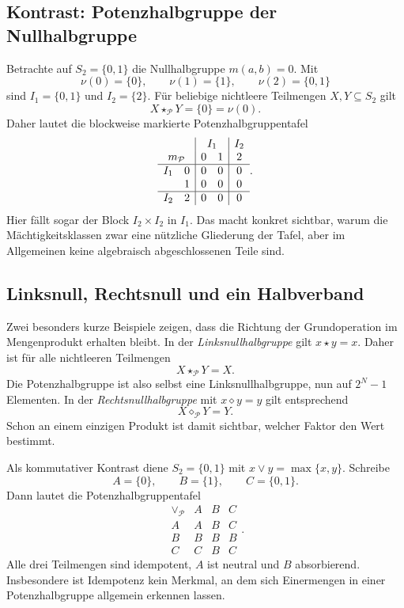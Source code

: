 \documentclass[main.tex]{subfiles}
\begin{document}
\subsection{Kontrast: Potenzhalbgruppe der Nullhalbgruppe}

Betrachte auf \(S_2=\{0,1\}\) die Nullhalbgruppe \(m(a,b)=0\).  Mit
\[
  \nu(0)=\{0\},
  \qquad
  \nu(1)=\{1\},
  \qquad
  \nu(2)=\{0,1\}
\]
sind \(I_1=\{0,1\}\) und \(I_2=\{2\}\).  Für beliebige nichtleere
Teilmengen \(X,Y\subseteq S_2\) gilt
\[
  X\star_{\mathcal P}Y=\{0\}=\nu(0).
\]
Daher lautet die blockweise markierte Potenzhalbgruppentafel
\[
\begin{array}{cc|cc|c}
\multicolumn{2}{c|}{}
  &\multicolumn{2}{c|}{I_1}
  &\multicolumn{1}{c}{I_2}\\
\multicolumn{2}{c|}{m_{\mathcal P}}&0&1&2\\\hline
I_1&0&0&0&0\\
   &1&0&0&0\\\hline
I_2&2&0&0&0
\end{array}.
\]
Hier fällt sogar der Block \(I_2\times I_2\) in \(I_1\).  Das macht konkret
sichtbar, warum die Mächtigkeitsklassen zwar eine nützliche Gliederung der
Tafel, aber im Allgemeinen keine algebraisch abgeschlossenen Teile sind.

\subsection{Linksnull, Rechtsnull und ein Halbverband}

Zwei besonders kurze Beispiele zeigen, dass die Richtung der Grundoperation
im Mengenprodukt erhalten bleibt.  In der \emph{Linksnullhalbgruppe} gilt
\(x\star y=x\).  Daher ist für alle nichtleeren Teilmengen
\[
  X\star_{\mathcal P}Y=X.
\]
Die Potenzhalbgruppe ist also selbst eine Linksnullhalbgruppe, nun auf
\(2^N-1\) Elementen.  In der \emph{Rechtsnullhalbgruppe} mit
\(x\diamond y=y\) gilt entsprechend
\[
  X\diamond_{\mathcal P}Y=Y.
\]
Schon an einem einzigen Produkt ist damit sichtbar, welcher Faktor den Wert
bestimmt.

Als kommutativer Kontrast diene \(S_2=\{0,1\}\) mit
\(x\vee y=\max\{x,y\}\).  Schreibe
\[
  A=\{0\},\qquad B=\{1\},\qquad C=\{0,1\}.
\]
Dann lautet die Potenzhalbgruppentafel
\[
\begin{array}{c|ccc}
\vee_{\mathcal P}&A&B&C\\\hline
A&A&B&C\\
B&B&B&B\\
C&C&B&C
\end{array}.
\]
Alle drei Teilmengen sind idempotent, \(A\) ist neutral und \(B\)
absorbierend.  Insbesondere ist Idempotenz kein Merkmal, an dem sich
Einermengen in einer Potenzhalbgruppe allgemein erkennen lassen.
\end{document}
